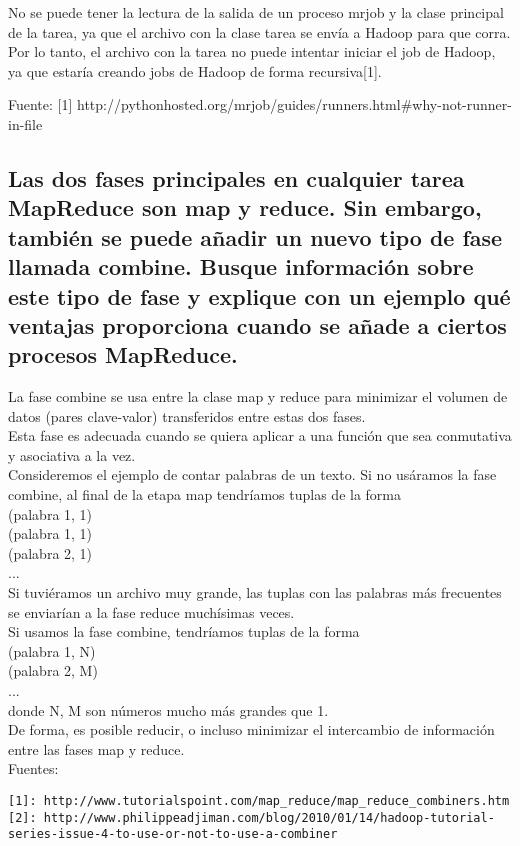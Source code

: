 \documentclass[12pt,a4paper,twoside,openright,titlepage,final]{article}
\begin{document}
No se puede tener la lectura de la salida de un proceso mrjob y la clase principal de la tarea, ya que el archivo con la clase tarea se envía a Hadoop para que corra. Por lo tanto, el archivo con la tarea no puede intentar iniciar el job de Hadoop, ya que estaría creando jobs de Hadoop de forma recursiva[1].

Fuente:
[1] http://pythonhosted.org/mrjob/guides/runners.html\#why-not-runner-in-file

\subsection{Las dos fases principales en cualquier tarea MapReduce son map y reduce. Sin embargo, también se puede añadir un nuevo tipo de fase llamada combine. Busque información sobre este tipo de fase y explique con un ejemplo qué ventajas proporciona cuando se añade a ciertos procesos MapReduce.}

La fase combine se usa entre la clase map y reduce para minimizar el volumen de datos (pares clave-valor) transferidos entre estas dos fases.\\

Esta fase es adecuada cuando se quiera aplicar a una función que sea conmutativa y asociativa a la vez.\\

Consideremos el ejemplo de contar palabras de un texto. Si no usáramos la fase combine, al final de la etapa map tendríamos tuplas de la forma \\
(palabra 1, 1)\\
(palabra 1, 1)\\
(palabra 2, 1)\\
...\\

Si tuviéramos un archivo muy grande, las tuplas con las palabras más frecuentes se enviarían a la fase reduce muchísimas veces.\\

Si usamos la fase combine, tendríamos tuplas de la forma\\
(palabra 1, N)\\
(palabra 2, M)\\
...\\

donde N, M son números mucho más grandes que 1.\\

De forma, es posible reducir, o incluso minimizar el intercambio de información entre las fases map y reduce.\\

Fuentes:

\begin{verbatim}
[1]: http://www.tutorialspoint.com/map_reduce/map_reduce_combiners.htm
[2]: http://www.philippeadjiman.com/blog/2010/01/14/hadoop-tutorial-series-issue-4-to-use-or-not-to-use-a-combiner
\end{verbatim}


 
\end{document}
